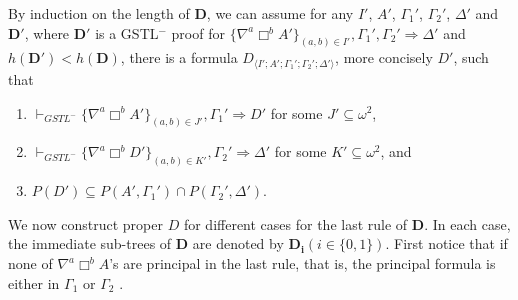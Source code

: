 By induction on the length of $\mathbf{D}$, we can assume for any $I'$, $A'$, $\Gamma_1'$, $\Gamma_2'$, $\Delta'$ and $\mathbf{D}'$, where $\mathbf{D}'$ is a GSTL$^-$ proof for $\{ \nabla^a \Box^b A' \}_{(a,b) \in I'} , \Gamma_1' , \Gamma_2' \Rightarrow \Delta'$ and $h(\mathbf{D}')<h(\mathbf{D})$, there is a formula $D_{\langle I';A';\Gamma_1';\Gamma_2';\Delta'\rangle}$, more concisely $D'$, such that
\begin{enumerate}[label=(\arabic*)]
	\item $\vdash_{GSTL^-} \{\nabla^a \Box^b A'\}_{(a,b) \in J'} , \Gamma_1' \Rightarrow D'$ for some $J' \subseteq \omega^2$,
	\item $\vdash_{GSTL^-} \{\nabla^a \Box^b D'\}_{(a,b) \in K'}, \Gamma_2' \Rightarrow \Delta'$ for some $K' \subseteq \omega^2$, and
	\item $P(D') \subseteq P(A',\Gamma_1') \cap P(\Gamma_2',\Delta')$.
\end{enumerate}
We now construct proper $D$ for different cases for the last rule of $\mathbf{D}$. In each case, the immediate sub-trees of $\mathbf{D}$ are denoted by $\mathbf{D_i} (i \in \{0,1\})$. First notice that if none of $\nabla^a \Box^b A$'s are principal in the last rule, that is, the principal formula is either in $\Gamma_1$ or $\Gamma_2$
\todo{}.

